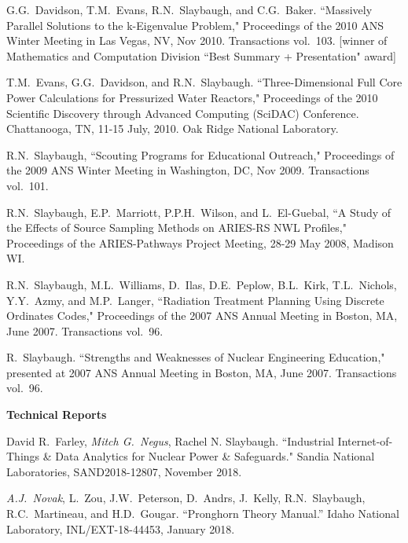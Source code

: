 \begin{bibsection}
\item G.G.\ Davidson, T.M.\ Evans, R.N.\ Slaybaugh, and C.G.\ Baker.  ``Massively Parallel Solutions to the k-Eigenvalue Problem," Proceedings of the 2010 ANS Winter Meeting in Las Vegas, NV, Nov 2010. Transactions vol.\ 103. [winner of Mathematics and Computation Division ``Best Summary + Presentation" award]

\item T.M.\ Evans, G.G.\ Davidson, and R.N.\ Slaybaugh.  ``Three-Dimensional Full Core Power Calculations for Pressurized Water Reactors," Proceedings of the 2010 Scientific Discovery through Advanced Computing (SciDAC) Conference. Chattanooga, TN, 11-15 July, 2010. Oak Ridge National Laboratory.

\item R.N.\ Slaybaugh, ``Scouting Programs for Educational Outreach," Proceedings of the 2009 ANS Winter Meeting in Washington, DC, Nov 2009. Transactions vol.\ 101.

\item R.N.\ Slaybaugh, E.P.\ Marriott, P.P.H.\ Wilson, and L.\ El-Guebal, ``A Study of the Effects of Source Sampling Methods on ARIES-RS NWL Profiles," Proceedings of the ARIES-Pathways Project Meeting, 28-29 May 2008, Madison WI. 

\item R.N.\ Slaybaugh, M.L.\ Williams, D.\ Ilas, D.E.\ Peplow, B.L.\ Kirk, T.L.\ Nichols, Y.Y.\ Azmy, and M.P.\ Langer, ``Radiation Treatment Planning Using Discrete Ordinates Codes," Proceedings of the 2007 ANS Annual Meeting in Boston, MA, June 2007. Transactions vol.\ 96.

\item R.\ Slaybaugh. ``Strengths and Weaknesses of Nuclear Engineering Education," presented at 2007 ANS Annual Meeting in Boston, MA, June 2007. Transactions vol.\ 96.

\item \textbf{Technical Reports}
\item David R.\ Farley, \textit{Mitch G.\ Negus}, Rachel N.
 Slaybaugh. ``Industrial Internet-of-Things \& Data Analytics for Nuclear Power \& Safeguards." Sandia National Laboratories, SAND2018-12807, November 2018.

\item	\textit{A.J.\ Novak}, L.\ Zou, J.W.\ Peterson, D.\ Andrs, J.\ Kelly, R.N.\ Slaybaugh, R.C.\ Martineau, and H.D.\ Gougar. “Pronghorn Theory Manual.” Idaho National Laboratory, INL/EXT-18-44453, January 2018.


\end{bibsection}

